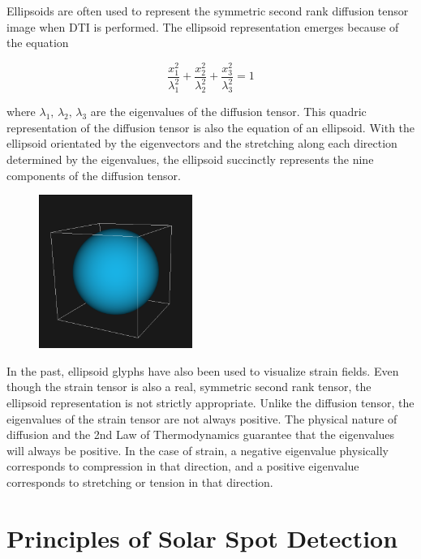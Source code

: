 \documentclass{InsightArticle}
\begin{document}
Ellipsoids are often used to represent the symmetric second rank diffusion
tensor image when DTI is performed. The ellipsoid representation emerges
because of the equation

\begin{equation}
  \frac{x_1^2}{\lambda_1^2} + \frac{x_2^2}{\lambda_2^2} + \frac{x_3^2}{\lambda_3^2} = 1
  \label{eqn:ellipsoid}
\end{equation}

where $\lambda_1 , \, \lambda_2, \, \lambda_3$ are the
eigenvalues of the diffusion tensor. This quadric representation of the
diffusion tensor is also the equation of an ellipsoid. With the ellipsoid
orientated by the eigenvectors and the stretching along each direction
determined by the eigenvalues, the ellipsoid succinctly represents the nine
components of the diffusion tensor.

\begin{figure}
\center
\includegraphics[width=5cm]{Sphere}
\label{fig:ellipsoid}
\end{figure}

In the past, ellipsoid glyphs have also been used to visualize strain fields.
Even though the strain tensor is also a real, symmetric second rank tensor,
the ellipsoid representation is not strictly appropriate. Unlike the diffusion
tensor, the eigenvalues of the strain tensor are not always positive. The
physical nature of diffusion and the 2nd Law of Thermodynamics guarantee that
the eigenvalues will always be positive. In the case of strain, a negative
eigenvalue physically corresponds to compression in that direction, and a
positive eigenvalue corresponds to stretching or tension in that direction.


\section{Principles of Solar Spot Detection}
\end{document}
